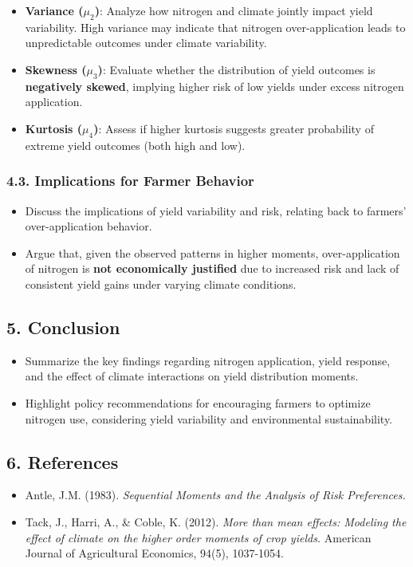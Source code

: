 \documentclass[
]{article}
\providecommand{\tightlist}{%
  \setlength{\itemsep}{0pt}\setlength{\parskip}{0pt}}\usepackage{longtable,booktabs,array}
\begin{document}
\begin{itemize}
\tightlist
\item
  \textbf{Variance (\(\mu_2\))}: Analyze how nitrogen and climate
  jointly impact yield variability. High variance may indicate that
  nitrogen over-application leads to unpredictable outcomes under
  climate variability.
\item
  \textbf{Skewness (\(\mu_3\))}: Evaluate whether the distribution of
  yield outcomes is \textbf{negatively skewed}, implying higher risk of
  low yields under excess nitrogen application.
\item
  \textbf{Kurtosis (\(\mu_4\))}: Assess if higher kurtosis suggests
  greater probability of extreme yield outcomes (both high and low).
\end{itemize}

\subsubsection{4.3. Implications for Farmer
Behavior}\label{implications-for-farmer-behavior}

\begin{itemize}
\tightlist
\item
  Discuss the implications of yield variability and risk, relating back
  to farmers' over-application behavior.
\item
  Argue that, given the observed patterns in higher moments,
  over-application of nitrogen is \textbf{not economically justified}
  due to increased risk and lack of consistent yield gains under varying
  climate conditions.
\end{itemize}

\subsection{5. Conclusion}\label{conclusion}

\begin{itemize}
\tightlist
\item
  Summarize the key findings regarding nitrogen application, yield
  response, and the effect of climate interactions on yield distribution
  moments.
\item
  Highlight policy recommendations for encouraging farmers to optimize
  nitrogen use, considering yield variability and environmental
  sustainability.
\end{itemize}

\subsection{6. References}\label{references}

\begin{itemize}
\tightlist
\item
  Antle, J.M. (1983). \emph{Sequential Moments and the Analysis of Risk
  Preferences.}
\item
  Tack, J., Harri, A., \& Coble, K. (2012). \emph{More than mean
  effects: Modeling the effect of climate on the higher order moments of
  crop yields.} American Journal of Agricultural Economics, 94(5),
  1037-1054.
\end{itemize}
\end{document}
